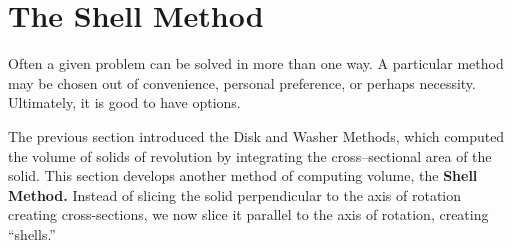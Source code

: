 \section{The Shell Method}\label{sec:shell_method}

Often a given problem can be solved in more than one way. A particular method may be chosen out of convenience, personal preference, or perhaps necessity. Ultimately, it is good to have options.

The previous section introduced the Disk and Washer Methods, which computed the volume of solids of revolution by integrating the cross--sectional area of the solid. This section develops another method of computing volume, the \textbf{Shell Method.} Instead of slicing the solid perpendicular to the axis of rotation creating cross-sections, we now slice it parallel to the axis of rotation, creating ``shells.''

